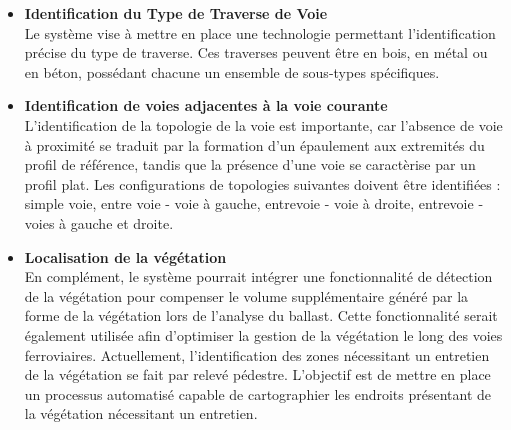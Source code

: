 \begin{itemize}
    \item \textbf{Identification du Type de Traverse de Voie} \\
    Le système vise à mettre en place une technologie permettant l'identification précise du type de traverse. Ces traverses peuvent être en bois, en métal ou en béton, possédant chacune un ensemble de sous-types spécifiques.
    
    \item \textbf{Identification de voies adjacentes à la voie courante} \\
    L'identification de la topologie de la voie est importante, car l'absence de voie à proximité se traduit par la formation d'un épaulement aux extremités du profil de référence, tandis que la présence d'une voie se caractèrise par un profil plat. Les configurations de topologies suivantes doivent être identifiées : simple voie, entre voie - voie à gauche, entrevoie - voie à droite, entrevoie - voies à gauche et droite. 

    \item \textbf{Localisation de la végétation} \\
    En complément, le système pourrait intégrer une fonctionnalité de détection de la végétation pour compenser le volume supplémentaire généré par la forme de la végétation lors de l'analyse du ballast. Cette fonctionnalité serait également utilisée afin d'optimiser la gestion de la végétation le long des voies ferroviaires. Actuellement, l'identification des zones nécessitant un entretien de la végétation se fait par relevé pédestre. L'objectif est de mettre en place un processus automatisé capable de cartographier les endroits présentant de la végétation nécessitant un entretien.

\end{itemize}













































